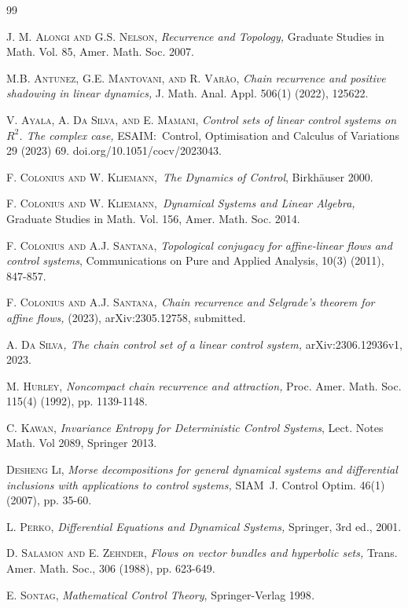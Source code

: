 \documentclass{siamltex}%
\begin{document}
\begin{thebibliography}{99}                                                                                               %


\textsc{J. M. Alongi and G.S. Nelson,}\emph{ Recurrence and
Topology,} Graduate Studies in Math. Vol. 85, Amer. Math. Soc. 2007.

\textsc{M.B. Antunez, G.E. Mantovani, and R. Var\~{a}o,}
\emph{Chain recurrence and positive shadowing in linear dynamics, }J. Math.
Anal. Appl. 506(1) (2022), 125622.

\textsc{V. Ayala, A. Da Silva, and E. Mamani,} \emph{Control
sets of linear control systems on }$R^{2}$\emph{. The complex case,}
ESAIM:\ Control, Optimisation and Calculus of Variations 29 (2023) 69. doi.org/10.1051/cocv/2023043.

\textsc{F. Colonius and W. Kliemann,}\emph{\ The Dynamics of
Control}, Birkh\"{a}user 2000.

\textsc{F. Colonius and W. Kliemann,}\emph{\ Dynamical
Systems and Linear Algebra, }Graduate Studies in Math. Vol. 156, Amer. Math.
Soc. 2014.

\textsc{F. Colonius and A.J. Santana}, \emph{Topological
conjugacy for affine-linear flows and control systems}, Communications on Pure
and Applied Analysis, 10(3) (2011), 847-857.

\textsc{F. Colonius and A.J. Santana}\emph{, Chain recurrence
and Selgrade's theorem for affine flows,} (2023), arXiv:2305.12758, submitted.

\textsc{A. Da Silva}\emph{, The chain control set of a
linear control system,} arXiv:2306.12936v1, 2023.

\textsc{M. Hurley,}\emph{ Noncompact chain recurrence and
attraction,} Proc. Amer. Math. Soc. 115(4) (1992), pp. 1139-1148.

\textsc{C. Kawan,}\emph{ Invariance Entropy for
Deterministic Control Systems}, Lect. Notes Math. Vol 2089, Springer 2013.

\textsc{Desheng Li,} \emph{Morse decompositions for general
dynamical systems and differential inclusions with applications to control
systems,} SIAM\ J. Control Optim. 46(1) (2007), pp. 35-60.

\textsc{L. Perko,} \emph{Differential Equations and Dynamical
Systems,} Springer, 3rd ed., 2001.

\textsc{D. Salamon and E. Zehnder,} \emph{Flows on vector
bundles and hyperbolic sets, }Trans. Amer. Math. Soc., 306 (1988), pp. 623-649.

\textsc{E. Sontag}, \emph{Mathematical Control Theory},
Springer-Verlag 1998\emph{.}
\end{thebibliography}
\end{document}
